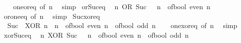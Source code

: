 \begin{isabellebody}
%
\isadelimproof
\ \ %
\endisadelimproof
%
\isatagproof
{}\isamarkupfalse%
\ one{\isacharunderscore}{\kern0pt}or{\isacharunderscore}{\kern0pt}eq\ {\isacharbrackleft}{\kern0pt}of\ n{\isacharbrackright}{\kern0pt}\ \isamarkupfalse%
\ simp%
\endisatagproof
{\isafoldproof}%
%
\isadelimproof
\isanewline
%
\endisadelimproof
\isanewline
{}\isamarkupfalse%
\ or{\isacharunderscore}{\kern0pt}Suc{\isacharunderscore}{\kern0pt}{}{\isacharunderscore}{\kern0pt}eq{\isacharcolon}{\kern0pt}\isanewline
\ \ {\isacartoucheopen}n\ OR\ Suc\ {}\ {\isacharequal}{\kern0pt}\ n\ {\isacharplus}{\kern0pt}\ of{\isacharunderscore}{\kern0pt}bool\ {\isacharparenleft}{\kern0pt}even\ n{\isacharparenright}{\kern0pt}{\isacartoucheclose}\isanewline
%
\isadelimproof
\ \ %
\endisadelimproof
%
\isatagproof
{}\isamarkupfalse%
\ or{\isacharunderscore}{\kern0pt}one{\isacharunderscore}{\kern0pt}eq\ {\isacharbrackleft}{\kern0pt}of\ n{\isacharbrackright}{\kern0pt}\ \isamarkupfalse%
\ simp%
\endisatagproof
{\isafoldproof}%
%
\isadelimproof
\isanewline
%
\endisadelimproof
\isanewline
{}\isamarkupfalse%
\ Suc{\isacharunderscore}{\kern0pt}{}{\isacharunderscore}{\kern0pt}xor{\isacharunderscore}{\kern0pt}eq{\isacharcolon}{\kern0pt}\isanewline
\ \ {\isacartoucheopen}Suc\ {}\ XOR\ n\ {\isacharequal}{\kern0pt}\ n\ {\isacharplus}{\kern0pt}\ of{\isacharunderscore}{\kern0pt}bool\ {\isacharparenleft}{\kern0pt}even\ n{\isacharparenright}{\kern0pt}\ {\isacharminus}{\kern0pt}\ of{\isacharunderscore}{\kern0pt}bool\ {\isacharparenleft}{\kern0pt}odd\ n{\isacharparenright}{\kern0pt}{\isacartoucheclose}\isanewline
%
\isadelimproof
\ \ %
\endisadelimproof
%
\isatagproof
{}\isamarkupfalse%
\ one{\isacharunderscore}{\kern0pt}xor{\isacharunderscore}{\kern0pt}eq\ {\isacharbrackleft}{\kern0pt}of\ n{\isacharbrackright}{\kern0pt}\ \isamarkupfalse%
\ simp%
\endisatagproof
{\isafoldproof}%
%
\isadelimproof
\isanewline
%
\endisadelimproof
\isanewline
{}\isamarkupfalse%
\ xor{\isacharunderscore}{\kern0pt}Suc{\isacharunderscore}{\kern0pt}{}{\isacharunderscore}{\kern0pt}eq{\isacharcolon}{\kern0pt}\isanewline
\ \ {\isacartoucheopen}n\ XOR\ Suc\ {}\ {\isacharequal}{\kern0pt}\ n\ {\isacharplus}{\kern0pt}\ of{\isacharunderscore}{\kern0pt}bool\ {\isacharparenleft}{\kern0pt}even\ n{\isacharparenright}{\kern0pt}\ {\isacharminus}{\kern0pt}\ of{\isacharunderscore}{\kern0pt}bool\ {\isacharparenleft}{\kern0pt}odd\ n{\isacharparenright}{\kern0pt}{\isacartoucheclose}\isanewline

\end{isabellebody}

